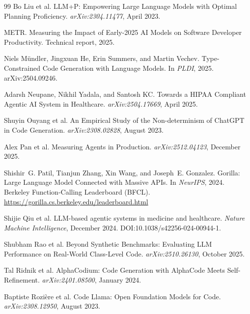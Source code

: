 \documentclass[11pt]{article}
\begin{document}
\begin{thebibliography}{99}
Bo Liu et al.
\newblock LLM+P: Empowering Large Language Models with Optimal Planning Proficiency.
\newblock \emph{arXiv:2304.11477}, April 2023.

METR.
\newblock Measuring the Impact of Early-2025 AI Models on Software Developer Productivity.
\newblock Technical report, 2025.

Niels M\"{u}ndler, Jingxuan He, Erin Summers, and Martin Vechev.
\newblock Type-Constrained Code Generation with Language Models.
\newblock In \emph{PLDI}, 2025.
\newblock arXiv:2504.09246.

Adarsh Neupane, Nikhil Yadala, and Santosh KC.
\newblock Towards a HIPAA Compliant Agentic AI System in Healthcare.
\newblock \emph{arXiv:2504.17669}, April 2025.

Shuyin Ouyang et al.
\newblock An Empirical Study of the Non-determinism of ChatGPT in Code Generation.
\newblock \emph{arXiv:2308.02828}, August 2023.

Alex Pan et al.
\newblock Measuring Agents in Production.
\newblock \emph{arXiv:2512.04123}, December 2025.

Shishir~G. Patil, Tianjun Zhang, Xin Wang, and Joseph~E. Gonzalez.
\newblock Gorilla: Large Language Model Connected with Massive APIs.
\newblock In \emph{NeurIPS}, 2024.
\newblock Berkeley Function-Calling Leaderboard (BFCL).
\newblock \url{https://gorilla.cs.berkeley.edu/leaderboard.html}

Shijie Qiu et al.
\newblock LLM-based agentic systems in medicine and healthcare.
\newblock \emph{Nature Machine Intelligence}, December 2024.
\newblock DOI:10.1038/s42256-024-00944-1.

Shubham Rao et al.
\newblock Beyond Synthetic Benchmarks: Evaluating LLM Performance on Real-World Class-Level Code.
\newblock \emph{arXiv:2510.26130}, October 2025.

Tal Ridnik et al.
\newblock AlphaCodium: Code Generation with AlphaCode Meets Self-Refinement.
\newblock \emph{arXiv:2401.08500}, January 2024.

Baptiste Rozi\`{e}re et al.
\newblock Code Llama: Open Foundation Models for Code.
\newblock \emph{arXiv:2308.12950}, August 2023.


\end{thebibliography}
\end{document}
